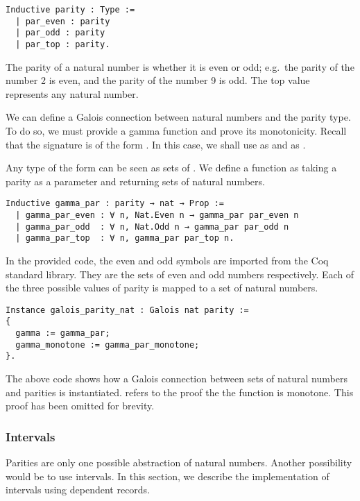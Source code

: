 \begin{listing}
\begin{verbatim}
Inductive parity : Type :=
  | par_even : parity
  | par_odd : parity
  | par_top : parity.
\end{verbatim}
\end{listing}

The parity of a natural number is whether it is even or odd; e.g.\ the parity
of the number 2 is even, and the parity of the number 9 is odd. The top value
represents any natural number.

We can define a Galois connection between natural numbers and the parity type.
To do so, we must provide a gamma function and prove its monotonicity. Recall
that the signature is of the form . In this
case, we shall use  as  and  as .

Any type of the form  can be seen as sets of . We define
a function  as taking a parity as a parameter and returning
sets of natural numbers.

\begin{listing}
\begin{verbatim}
Inductive gamma_par : parity → nat → Prop :=
  | gamma_par_even : ∀ n, Nat.Even n → gamma_par par_even n
  | gamma_par_odd  : ∀ n, Nat.Odd n → gamma_par par_odd n
  | gamma_par_top  : ∀ n, gamma_par par_top n.
\end{verbatim}
\end{listing}

In the provided code, the even and odd symbols are imported from the Coq
standard library. They are the sets of even and odd numbers respectively. Each
of the three possible values of parity is mapped to a set of natural numbers.

\begin{listing}
\begin{verbatim}
Instance galois_parity_nat : Galois nat parity :=
{
  gamma := gamma_par;
  gamma_monotone := gamma_par_monotone;
}.
\end{verbatim}
\end{listing}

The above code shows how a Galois connection between sets of natural numbers 
and parities is instantiated.  refers to the proof the
the  function is monotone. This proof has been omitted for 
brevity.

\subsubsection{Intervals}
Parities are only one possible abstraction of natural numbers. Another
possibility would be to use intervals. In this section, we describe the
implementation of intervals using dependent records.

